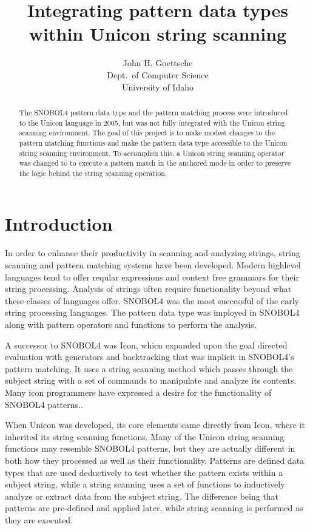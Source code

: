 \documentclass{article}
\begin{document}
\title{Integrating pattern data types within Unicon string scanning}
\author{John H. Goettsche\\
  Dept.\ of Computer Science\\
  University of Idaho}

\maketitle

\begin{abstract}
The SNOBOL4 pattern data type and the pattern matching process were introduced to the Unicon language in 2005, but was not fully integrated with the Unicon string scanning environment.  The goal of this project is to make modest changes to the pattern matching functions and make the pattern data type accessible to the Unicon string scanning environment.  To accomplish this, a Unicon string scanning operator was changed to to execute a pattern match in the anchored mode in order to preserve the logic behind the string scanning operation. 

\end{abstract}

\pagebreak
\tableofcontents

\pagebreak
\section{Introduction}
In order to enhance their productivity in scanning and analyzing strings, string scanning and pattern matching systems have been developed.  Modern highlevel languages tend to offer reqular expressions and context free grammars for their string processing.  Analysis of strings often require functionality beyond what these classes of languages offer.  SNOBOL4 was the most successful of the early string processing languages.\cite{Gaikaiwari2005}  The pattern data type was imployed in SNOBOL4 along with pattern operators and functions to perform the analysis.

A successor to SNOBOL4 was Icon, whicn expanded upon the goal directed evaluation with generators and backtracking that was implicit in SNOBOL4's pattern matching.\cite{Gaikaiwari2005}  It uses a string scanning method which passes through the subject string with a set of commands to manipulate and analyze its contents.  Many icon programmers have expressed a desire for the functionality of SNOBOL4 patterns.\cite{Griswold1980}.

When Unicon was developed, its core elements came directly from Icon, where it inherited its string scanning functions.\cite{JefferyUnicon}  Many of the Unicon string scanning functions may resemble SNOBOL4 patterns, but they are actually different in both how they processed as well as their functionality.  Patterns are defined data types that are used deductively to test whether the pattern exists within a subject string, while a string scanning uses a set of functions to inductively analyze or extract data from the subject string.  The difference being that patterns are pre-defined and applied later, while string scanning is performed as they are executed.
\end{document}
